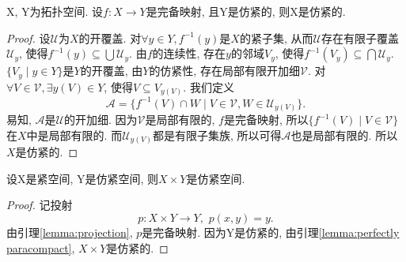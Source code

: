 \begin{lemma} \label{lemma:perfectly paracompact}
  X, Y为拓扑空间. 设$f : X \longrightarrow Y$是完备映射, 且Y是仿紧的,
  则X是仿紧的.
\end{lemma}
\begin{proof}
  设$\mathscr{U}$为$X$的开覆盖. 对$\forall y \in Y, f^{-1}(y)$是$X$的紧子集,
  从而$\mathscr{U}$存在有限子覆盖$\mathscr{U}_y$,
  使得$f^{-1}(y) \subseteq \bigcup \mathscr{U}_y$.
  由$f$的连续性, 存在$y$的邻域$V_y$,
  使得$f^{-1}(V_y) \subseteq \bigcap \mathscr{U}_y$.
  $\{ V_y \mid y \in Y \}$是$Y$的开覆盖, 由$Y$的仿紧性,
  存在局部有限开加细$\mathscr{V}$.
  对$\forall V \in \mathscr{V}, \exists y(V) \in Y$,
  使得$V \subseteq V_{y(V)}$. 我们定义
  \[
    \mathscr{A} = \{ f^{-1}(V) \cap W \mid V \in \mathscr{V}, W \in \mathscr{U}_{y(V)} \}.
  \]
  易知, $\mathscr{A}$是$\mathscr{U}$的开加细.
  因为$\mathscr{V}$是局部有限的, $f$是完备映射,
  所以$\{ f^{-1}(V) \mid V \in \mathscr{V} \}$在$X$中是局部有限的.
  而$\mathscr{U}_{y(V)}$都是有限子集族,
  所以可得$\mathscr{A}$也是局部有限的. 所以$X$是仿紧的.
\end{proof}

\begin{proposition}
  设X是紧空间, Y是仿紧空间, 则$X \times Y$是仿紧空间.
\end{proposition}
\begin{proof}
  记投射
  \[
    p : X \times Y \longrightarrow Y,\,\, p(x, y) = y.
  \]
  由引理\ref{lemma:projection}, $p$是完备映射.
  因为Y是仿紧的, 由引理\ref{lemma:perfectly paracompact},
  $X \times Y$是仿紧的.
\end{proof}
